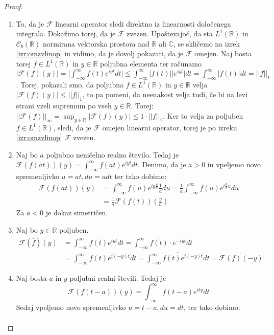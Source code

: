 \documentclass[a4paper, 10pt]{article}
\newcommand{\abs}[1]{\ensuremath{\lvert #1 \rvert}}
\newcommand{\mth}[1]{\ensuremath{\mathbb{#1}}}
\newcommand{\R}{\mth{R}}
\newcommand{\C}{\mth{C}}
\begin{document}
			\begin{proof}
				\begin{enumerate}
					\item To, da je $\mathcal{F}$ linearni operator sledi direktno iz linearnosti določenega integrala. Dokažimo torej, da je $\mathcal{F}$ zvezen. Upoštevajoč, da sta $L^1(\R)$ in $\mathcal{C}_b(\R)$ normirana vektorska prostora nad $\R$ ali $\C$, se skličemo na izrek \ref{izr:omzvlinop} in vidimo, da je dovolj pokazati, da je $\mathcal{F}$ omejen. Naj bosta torej $f\in L^1(\R)$ in $y\in \R$ poljubna elementa ter računamo $\abs{\mathcal{F}(f)(y)} = \abs{\int_{-\infty}^\infty f(t)e^{iyt}dt}\leq \int_{-\infty}^{\infty}\abs{f(t)}\abs{e^{iyt}}dt = \int_{-\infty}^{\infty}\abs{f(t)}dt = \abs{\abs{f}}_1$. Torej, pokazali smo, da poljubna $f\in L^1(\R)$ in $y\in \R$ velja $\abs{\mathcal{F}(f)(y)} \leq \abs{\abs{f}}_1$, to pa pomeni, da neenakost velja tudi, če bi na levi strani vzeli supremum po vseh $y\in\R$. Torej: $\abs{\abs{\mathcal{F}(f)}}_\infty = \sup_{y\in\R}\abs{\mathcal{F}(f)(y)} \leq 1\cdot \abs{\abs{f}}_1$. Ker to velja za poljuben $f\in L^1(\R)$, sledi, da je $\mathcal{F}$ omejen linearni operator, torej je po izreku \ref{izr:omzvlinop} $\mathcal{F}$ zvezen.
					\item Naj bo $a$ poljubno neničelno realno število. Tedaj je $\mathcal{F}(f(at))(y) = \int_{-\infty}^\infty f(at)e^{iyt}dt$. Denimo, da je $a>0$ in vpeljemo novo spremenljivko $u = at, du = a dt$ ter tako dobimo: \begin{align*}\mathcal{F}(f(at))(y) &= \int_{-\infty}^\infty f(u)e^{iy\frac{u}{a}}\frac{1}{a}du = \frac{1}{a}\int_{-\infty}^\infty f(u)e^{i\frac{y}{a}u}du \\ &= \frac{1}{a}\mathcal{F}(f(t))(\frac{y}{a})\end{align*} Za $a<0$ je dokaz simetričen.
					\item Naj bo $y\in\R$ poljuben. \begin{align*}
						\mathcal{F}(\bar{f})(y) &= \int_{-\infty}^\infty \overline{f(t)}e^{iyt}dt = \int_{-\infty}^\infty \overline{f(t)}\cdot\overline{e^{-iyt}}dt \\ &= \int_{-\infty}^\infty \overline{f(t)e^{i(-y)t}}dt = \overline{\int_{-\infty}^\infty f(t)e^{i(-y)t}dt} = \overline{\mathcal{F}(f)(-y)}
					\end{align*}
					\item Naj bosta $a$ in $y$ poljubni realni števili. Tedaj je $$\mathcal{F}(f(t-a))(y) = \int_{-\infty}^{\infty}f(t-a)e^{ity}dt$$ Sedaj vpeljemo novo spremenljivko $u = t-a, du = dt$, ter tako dobimo:\begin{align*}

\end{align*}
\end{enumerate}
\end{proof}
\end{document}
